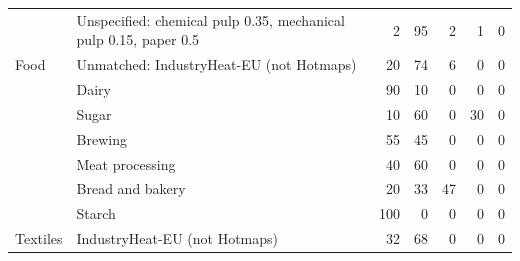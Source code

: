 \documentclass[11pt]{article}
\begin{document}
\begin{table}[h]
\begin{tabular}{l p{} rrrrr}
 & Unspecified: chemical pulp 0.35, mechanical pulp 0.15, paper 0.5 & 2 & 95 & 2 & 1 & 0 \\
Food & Unmatched: IndustryHeat-EU\cite{industryheateu2025} (not Hotmaps) & 20 & 74 & 6 & 0 & 0 \\
 & Dairy & 90 & 10 & 0 & 0 & 0 \\
 & Sugar & 10 & 60 & 0 & 30 & 0 \\
 & Brewing & 55 & 45 & 0 & 0 & 0 \\
 & Meat processing & 40 & 60 & 0 & 0 & 0 \\
 & Bread and bakery & 20 & 33 & 47 & 0 & 0 \\
 & Starch & 100 & 0 & 0 & 0 & 0 \\
Textiles & IndustryHeat-EU\cite{industryheateu2025} (not Hotmaps) & 32 & 68 & 0 & 0 & 0 \\
\bottomrule
\end{tabular}
\end{table}
\end{document}
